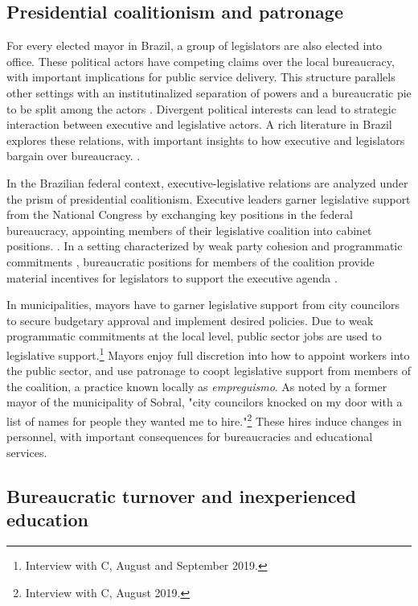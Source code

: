 \documentclass[12pt,a4paper]{article}
\begin{document}
\subsection*{Presidential coalitionism and patronage}

For every elected mayor in Brazil, a group of legislators are also elected into office. These political actors have competing claims over the local bureaucracy, with important implications for public service delivery. This structure parallels other settings with an institutinalized separation of powers and a bureaucratic pie to be split among the actors \citep{grindle_jobs_2012, mccarty_appointments_2004}. Divergent political interests can lead to strategic interaction between executive and legislative actors. A rich literature in Brazil explores these relations, with important insights to how executive and legislators bargain over bureaucracy. \citet{raile_executive_2011, power_optimism_2010}. 

In the Brazilian federal context, executive-legislative relations are analyzed under the prism of presidential coalitionism. Executive leaders garner legislative support from the National Congress by exchanging key positions in the federal bureaucracy, appointing members of their legislative coalition into cabinet positions. \citep{raile_executive_2011}. In a setting characterized by weak party cohesion and programmatic commitments \citet{ames_electoral_1995, lucas_ideological_2010}, bureaucratic positions for members of the coalition provide material incentives for legislators to support the executive agenda \citet{batista_o_2013, neto_presidential_2006, figueiredo_executivo_1999}.

In municipalities, mayors have to garner legislative support from city councilors to secure budgetary approval and implement desired policies. Due to weak programmatic commitments at the local level, public sector jobs are used to legislative support.\footnote{Interview with C, August and September 2019.} Mayors enjoy full discretion into how to appoint workers into the public sector, and use patronage to coopt legislative support from members of the coalition, a practice known locally as \textit{empreguismo}. As noted by a former mayor of the municipality of Sobral, "city councilors knocked on my door with a list of names for people they wanted me to hire."\footnote{Interview with C, August 2019.} These hires induce changes in personnel, with important consequences for bureaucracies and educational services.

\subsection*{Bureaucratic turnover and inexperienced education}
\end{document}
